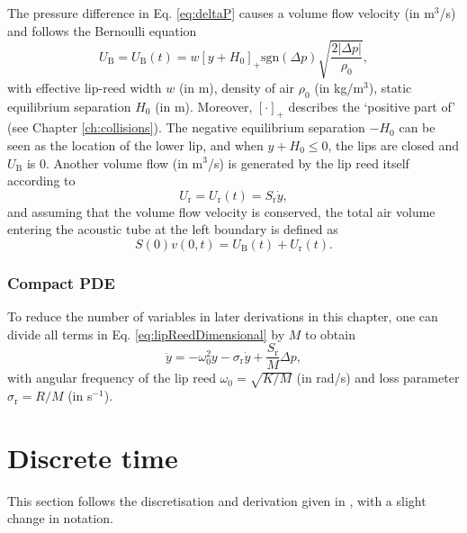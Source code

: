 The pressure difference in Eq. \eqref{eq:deltaP} causes a volume flow velocity (in  m$^3$/s) and follows the Bernoulli equation
\begin{equation}
    U_\text{B} = U_\text{B}(t) = w[y + H_0]_+\text{sgn}(\Delta p) \sqrt{\frac{2|\Delta p|}{\rho_0}},
\end{equation}
with effective lip-reed width $w$ (in m), density of air $\rho_0$ (in kg/m$^3$), static equilibrium separation $H_0$ (in m). Moreover, $[\cdot]_+$ describes the `positive part of' (see Chapter \ref{ch:collisions}). The negative equilibrium separation $-H_0$ can be seen as the location of the lower lip, and when $y + H_0 \leq 0$, the lips are closed and $U_\text{B}$ is 0. Another volume flow (in m$^3$/s) is generated by the lip reed itself according to
\begin{equation}
    U_\text{r} = U_\text{r}(t) = S_\text{r} \dot y,
\end{equation}
and assuming that the volume flow velocity is conserved, the total air volume entering the acoustic tube at the left boundary is defined as
\begin{equation}
    S(0)v(0,t) = U_\text{B}(t) + U_\text{r}(t).
\end{equation} 

\subsubsection{Compact PDE}
To reduce the number of variables in later derivations in this chapter, one can divide all terms in Eq. \eqref{eq:lipReedDimensional} by $M$ to obtain
\begin{equation}
    \ddot y = -\omega_0^2 y - \sigma_\text{r} \dot y + \frac{S_\text{r}}{M}\Delta p,
\end{equation}
with angular frequency of the lip reed $\omega_0 = \sqrt{K/M}$ (in rad/s) and loss parameter $\sigma_\text{r} = R / M$ (in s$^{-1}$). 

\section{Discrete time}\label{sec:discreteLipReed}
\def\nph{}
\def\nphSys{n+1/2}
This section follows the discretisation and derivation given in \cite[Sec. 5.1.3, pp. 140--141]{Harrison2018}, with a slight change in notation.

